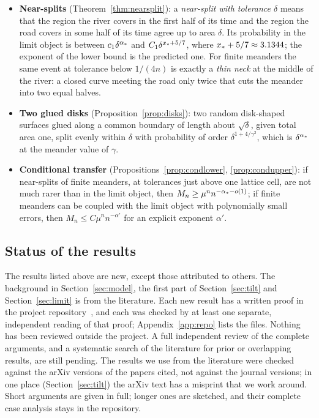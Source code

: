 \begin{itemize}
\item \textbf{Near-splits} (Theorem~\ref{thm:nearsplit}): a \emph{near-split with tolerance
$\delta$} means that the region the river covers in the first half of its time and the region the
road covers in some half of its time agree up to area $\delta$. Its probability in the limit object
is between $c_1\delta^{\alpha_*}$ and $C_1\delta^{x_*+5/7}$, where $x_*+5/7\approx3.1344$; the
exponent of the lower bound is the predicted one. For finite meanders the same event at tolerance
below $1/(4n)$ is exactly a \emph{thin neck} at the middle of the river: a closed curve meeting the
road only twice that cuts the meander into two equal halves.
\item \textbf{Two glued disks} (Proposition~\ref{prop:disks}): two random disk-shaped surfaces glued
along a common boundary of length about $\sqrt\delta$, given total area one, split evenly within
$\delta$ with probability of order $\delta^{1+4/\gamma^2}$, which is $\delta^{\alpha_*}$ at the meander
value of $\gamma$.
\item \textbf{Conditional transfer} (Propositions~\ref{prop:condlower}, \ref{prop:condupper}): if
near-splits of finite meanders, at tolerances just above one lattice cell, are not much rarer than in the
limit object, then $M_n\ge\mu^nn^{-\alpha_*-o(1)}$; if finite meanders can be coupled with the limit
object with polynomially small errors, then $M_n\le C\mu^nn^{-\alpha'}$ for an explicit exponent
$\alpha'$.
\end{itemize}

\subsection{Status of the results}

The results listed above are new, except those attributed to others. The background in
Section~\ref{sec:model}, the first part of Section~\ref{sec:tilt} and Section~\ref{sec:limit} is
from the literature. Each new result has a written proof in the project repository~\cite{Repo}, and
each was checked by at least one separate, independent reading of that proof;
Appendix~\ref{app:repo} lists the files. Nothing has been reviewed outside the project. A full
independent review of the complete arguments, and a systematic search of the literature for
prior or overlapping results, are still pending. The results we use from the literature were
checked against the arXiv versions of the papers cited, not against the journal versions; in one
place (Section~\ref{sec:tilt}) the arXiv text has a misprint that we work around. Short arguments
are given in full; longer ones are sketched, and their complete case analysis stays in the
repository.

